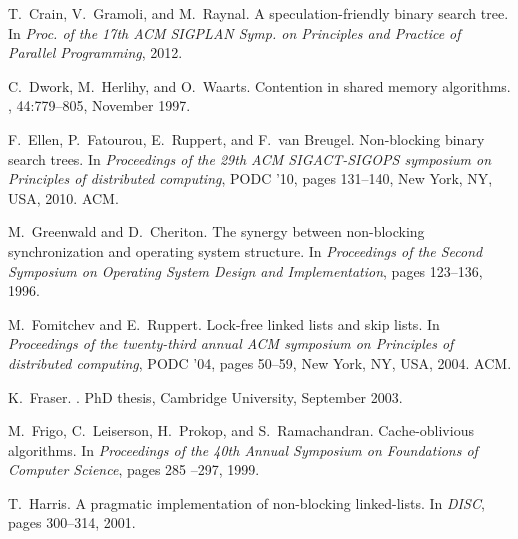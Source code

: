 \begin{thebibliography}{99}
{
T.~Crain, V.~Gramoli, and M.~Raynal.
\newblock A speculation-friendly binary search tree.
\newblock In {\em Proc. of the 17th ACM SIGPLAN Symp. on Principles and
  Practice of Parallel Programming}, 2012.


C.~Dwork, M.~Herlihy, and O.~Waarts.
\newblock Contention in shared memory algorithms.
, 44:779--805, November 1997.

F.~Ellen, P.~Fatourou, E.~Ruppert, and F.~van Breugel.
\newblock Non-blocking binary search trees.
\newblock In {\em Proceedings of the 29th ACM SIGACT-SIGOPS symposium on
  Principles of distributed computing}, PODC '10, pages 131--140, New York, NY,
  USA, 2010. ACM.


M.~Greenwald and D.~Cheriton.
\newblock The synergy between non-blocking synchronization and operating system structure.
\newblock In {\em Proceedings of the Second Symposium on Operating System
Design and Implementation}, pages 123--136, 1996.


M.~Fomitchev and E.~Ruppert.
\newblock Lock-free linked lists and skip lists.
\newblock In {\em Proceedings of the twenty-third annual ACM symposium on
  Principles of distributed computing}, PODC '04, pages 50--59, New York, NY,
  USA, 2004. ACM.


K.~Fraser.
.
\newblock PhD thesis, Cambridge University, September 2003.



M.~Frigo, C.~Leiserson, H.~Prokop, and S.~Ramachandran.
\newblock Cache-oblivious algorithms.
\newblock In {\em Proceedings of the 40th Annual Symposium on Foundations of
  Computer Science}, pages 285 --297, 1999.



T.~Harris.
\newblock A pragmatic implementation of non-blocking linked-lists.
\newblock In {\em DISC}, pages 300--314, 2001.


}
\end{thebibliography}
